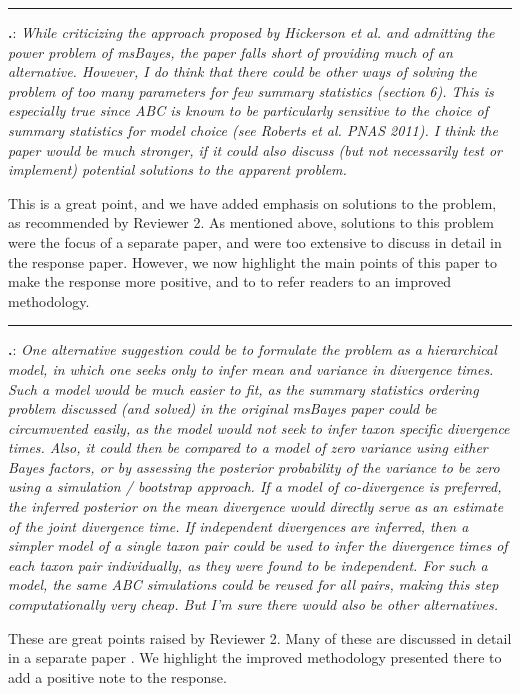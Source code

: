 \documentclass[12pt]{article}
\newcounter{commentCounter}
\newcommand{\revcomment}[1]{{\addtocounter{commentCounter}{1}}
    \medskip \hrule \noindent
\textbf{\arabic{section}.\arabic{commentCounter}}: {\sl #1}\par\xspace}
\newcommand{\response}[1]{{\addtolength{\leftskip}{0.25in} #1\par}\xspace}
\begin{document}
\revcomment{
    While criticizing the approach proposed by Hickerson et al. and admitting
    the power problem of msBayes, the paper falls short of providing much of an
    alternative. However, I do think that there could be other ways of solving
    the problem of too many parameters for few summary statistics (section 6).
    This is especially true since ABC is known to be particularly sensitive to
    the choice of summary statistics for model choice (see Roberts et al. PNAS
    2011). I think the paper would be much stronger, if it could also discuss
    (but not necessarily test or implement) potential solutions to the apparent
    problem.
}
\response{
    This is a great point, and we have added emphasis on solutions to the
    problem, as recommended by Reviewer 2. As mentioned above, solutions to
    this problem were the focus of a separate paper, and were too extensive to
    discuss in detail in the response paper. However, we now highlight the main
    points of this paper to make the response more positive, and to to refer
    readers to an improved methodology.
}

\revcomment{
    One alternative suggestion could be to formulate the problem as a
    hierarchical model, in which one seeks only to infer mean and variance in
    divergence times. Such a model would be much easier to fit, as the summary
    statistics ordering problem discussed (and solved) in the original msBayes
    paper could be circumvented easily, as the model would not seek to infer
    taxon specific divergence times. Also, it could then be compared to a model
    of zero variance using either Bayes factors, or by assessing the posterior
    probability of the variance to be zero using a simulation / bootstrap
    approach. If a model of co-divergence is preferred, the inferred posterior
    on the mean divergence would directly serve as an estimate of the joint
    divergence time. If independent divergences are inferred, then a simpler
    model of a single taxon pair could be used to infer the divergence times of
    each taxon pair individually, as they were found to be independent. For
    such a model, the same ABC simulations could be reused for all pairs,
    making this step computationally very cheap. But I'm sure there would also
    be other alternatives.
}
\response{
    These are great points raised by Reviewer 2. Many of these are
    discussed in detail in a separate paper \citep{Oaks2014dpp}.
    We highlight the improved methodology presented there to add a positive
    note to the response.
}
\end{document}
